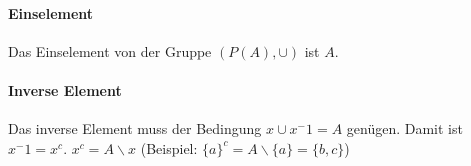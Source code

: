   
  \paragraph*{Einselement}
  Das Einselement von der Gruppe $(P(A),\cup)$ ist $A$.
  
  \paragraph*{Inverse Element}
  Das inverse Element muss der Bedingung $x\cup x^-1=A$ genügen. Damit ist $x^-1=x^c$.
  $x^c=A\backslash x$ (Beispiel: $\{a\}^c = A\backslash \{a\} = \{b,c\}$)

